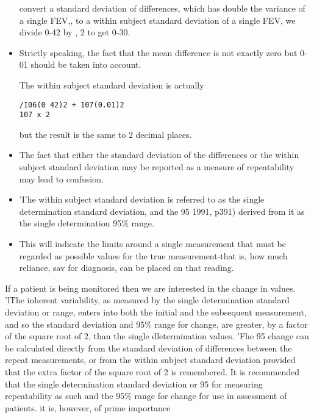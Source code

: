 \documentclass[MAIN.tex]{subfiles}
\begin{document}
\begin{itemize}
convert a standard deviation of differences,
which has double the variance of a single
FEV,, to a within subject standard deviation
of a single FEV, we divide 0-42 by ,
2 to get
0-30. \item Strictly speaking, the fact that the mean
difference is not exactly zero but 0-01 should
be taken into account. 

The within subject
standard deviation is actually

\begin{verbatim}
/I06(0 42)2 + 107(0.01)2
107 x 2
\end{verbatim}
but the result is the same to 2 decimal places.
\item The fact that either the standard deviation
of the differences or the within subject standard
deviation may be reported as a measure of repeatability may lead to confusion.
\item  'I'he
within subject standard deviation is referred
to as the single determination standard deviation,
and the 95%
1991, p391) derived from it as the single
determination 95\% range. \item This will indicate
the limits around a single measurement that
must be regarded as possible values for the
true measurement-that is, how much
reliance, sav for diagnosis, can be placed on
that reading.
\end{itemize}
If a patient is being monitored then we are
interested in the change in values. 'lThe
inherent variability, as measured by the single
determination standard deviation or range,
enters into both the initial and the subsequent
measurement, and so the standard deviation
and 95\% range for change, are greater, by a
factor of the square root of 2, than the single dletermination values. 'Fhe 95%
change can be calculated directly from the standard deviation of differences between the
repeat measurements, or from the within subject standard deviation provided that the extra factor of the square root of 2 is remembered.
It is recommended that the single determination standard deviation or 95%
for measuring repeatability as such and the
95\% range for change for use in assessment of
patients. it is, however, of prime importance
\end{document}
